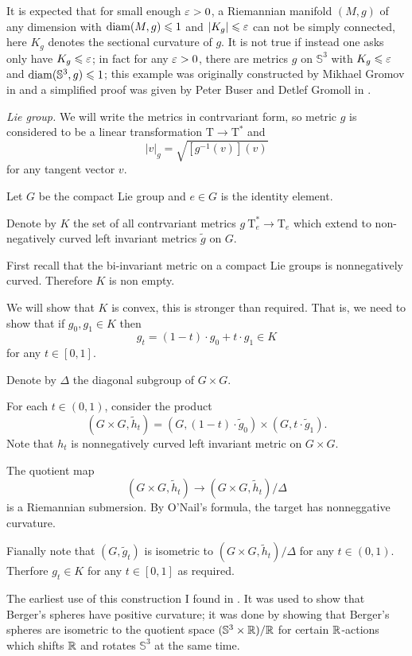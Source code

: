 It is expected that for small enough $\varepsilon>0$,
a Riemannian manifold $(M,g)$ of any dimension 
with  $\operatorname{\rm diam}(M,g)\leqslant 1$ and $|K_g|\leqslant \varepsilon$ can not be simply connected,
here $K_g$ denotes the sectional curvature of $g$.
It is not true if instead one asks only have $K_g\leqslant \varepsilon$;
in fact for any $\varepsilon>0$,
there are metrics $g$ on $\mathbb{S}^3$ 
with $K_g\leqslant \varepsilon$ and $\operatorname{\rm diam}(\mathbb{S}^3,g)\leqslant 1$; 
this example was originally constructed by Mikhael Gromov in \cite{gromov-almost-flat} and a simplified proof was given by 
Peter Buser
and Detlef Gromoll in \cite{buser-gromoll}.


\textit{Lie group.} We will write the metrics in contrvariant form, 
so metric $g$ is considered to be a linear transformation $\mathrm T\to \mathrm T^*$ and 
\[|v|_g=\sqrt{[g^{-1}(v)](v)}\]
for any tangent vector $v$.


Let $G$ be the compact Lie group and $e\in G$ is the identity element.

Denote by $K$ the set of all contrvariant metrics $g\:\mathrm{T}^*_e\to \mathrm{T}_e $ 
which extend to non-negatively curved left invariant metrics $\tilde g$ on $G$. 

First recall that the bi-invariant metric on a compact Lie groups is nonnegatively curved. 
Therefore $K$ is non empty.

We will show that $K$ is convex, this is stronger than required.
That is, we need to show that if $g_0, g_1\in K$
then 
\[g_t=(1-t)\cdot g_0+t\cdot g_1\in K\] 
for any $t\in [0,1]$.

Denote by $\Delta$ the diagonal subgroup of $G\times G$.

For each $t\in (0,1)$, consider the product 
\[(G\times G,\tilde h_t)
=
(G,(1-t)\cdot \tilde g_0)\times (G,t\cdot \tilde g_1).\]
Note that $h_t$ is nonnegatively curved left invariant metric on $G\times G$.

The quotient map 
\[
 (G\times G,\tilde h_t)\to (G\times G,\tilde h_t)/\Delta
\]
is a Riemannian submersion.
By O'Nail's formula,
the target has nonneggative curvature.

Fianally note that $(G,\tilde g_t)$
is isometric to
$(G\times G,\tilde h_t)/\Delta$ for any $t\in (0,1)$.
Therfore $g_t\in K$ for any $t\in [0,1]$ as required.

The earliest use of this construction 
I found  in \cite{GKM}.
It was used to show that Berger's spheres have positive curvature;
it was done by showing that
Berger's spheres are isometric to the quotient space $(\mathbb S^3\times \mathbb{R})/\mathbb{R}$ for certain $\mathbb{R}$-actions which shifts $\mathbb{R}$ and rotates $\mathbb{S}^3$ at the same time.

